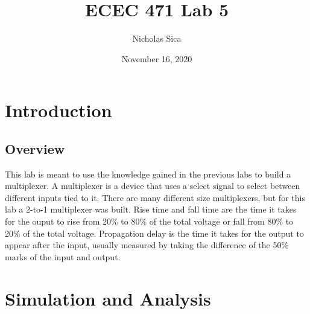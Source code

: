 \documentclass[12pt]{article}
\begin{document}
\title{ECEC 471 Lab 5}
\author{Nicholas Sica}
\date{November 16, 2020}
\maketitle

\section{Introduction}
\subsection{Overview}
This lab is meant to use the knowledge gained in the previous labs to build a multiplexer.
A multiplexer is a device that uses a select signal to select between different inputs tied
to it. There are many different size multiplexers, but for this lab a 2-to-1 multiplexer was built.
Rise time and fall time are the time it takes for the ouput to rise from 20\% to 80\% of the total
voltage or fall from 80\% to 20\% of the total voltage. Propagation delay is the time it takes for
the output to appear after the input, usually measured by taking the difference of the 50\% marks
of the input and output.
\section{Simulation and Analysis}
\end{document}
